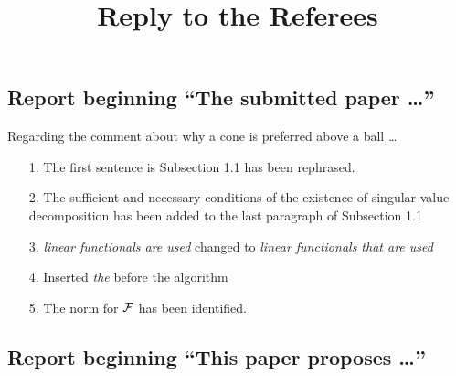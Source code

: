 \documentclass[letter]{article}
\begin{document}
\title{Reply to the Referees}
\maketitle



\subsection*{Report beginning ``The submitted paper \ldots''}

Regarding the comment about why a cone is preferred above a ball \ldots

\begin{enumerate}
    \item[1.] The first sentence is Subsection 1.1 has been rephrased.
    \item[2.] The sufficient and necessary conditions of the existence of singular value decomposition has been added  to  the last paragraph of Subsection 1.1
    \item[3.] \textit{linear functionals are used} changed to 
    \textit{linear functionals that are used}
    \item[4.] Inserted \textit{the} before the algorithm
    \item[5.] The norm for ${\mathcal{F}}$ has been identified.
\end{enumerate}


\subsection*{Report beginning ``This paper proposes \ldots''}
\end{document}
